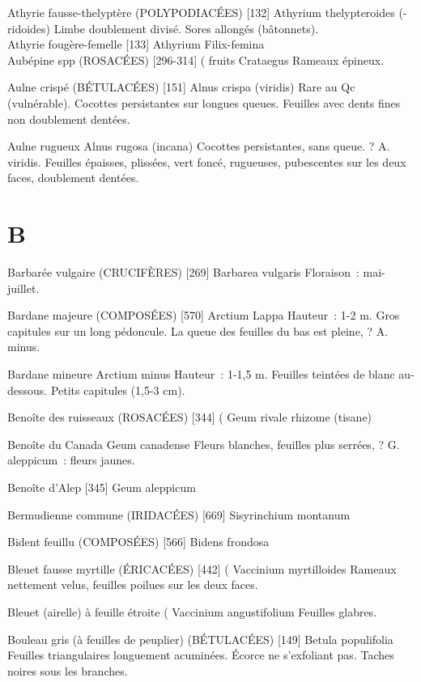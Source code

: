 \documentclass[book,12pt,a4paper,onecolumn,openany]{memoir}
\begin{document}
Athyrie fausse-thelyptère (POLYPODIACÉES)  [132]
				Athyrium thelypteroides (-ridoides)
Limbe doublement divisé. Sores allongés (bâtonnets).\\

Athyrie fougère-femelle  [133]
				Athyrium Filix-femina\\

Aubépine spp (ROSACÉES)  [296-314]				( fruits
				Crataegus
Rameaux épineux.

Aulne crispé (BÉTULACÉES)  [151]
				Alnus crispa (viridis)
Rare au Qc (vulnérable). Cocottes persistantes sur longues queues.
Feuilles avec dents fines non doublement dentées.

Aulne rugueux
				Alnus rugosa (incana)
Cocottes persistantes, sans queue. ? A. viridis.
Feuilles épaisses, plissées, vert foncé, rugueuses, pubescentes sur les deux faces, doublement dentées.
\chapter*{B}

Barbarée vulgaire (CRUCIFÈRES)  [269]
				Barbarea vulgaris
Floraison : mai-juillet.

Bardane majeure (COMPOSÉES)  [570]
				Arctium Lappa
Hauteur : 1-2 m. Gros capitules sur un long pédoncule. La queue des feuilles du bas est pleine, ? A. minus.

Bardane mineure
				Arctium minus
Hauteur : 1-1,5 m. Feuilles teintées de blanc au-dessous. Petits capitules (1,5-3 cm).

Benoîte des ruisseaux (ROSACÉES)  [344]			(
				Geum rivale			rhizome (tisane)

Benoîte du Canada
				Geum canadense
Fleurs blanches, feuilles plus serrées, ? G. aleppicum : fleurs jaunes.


Benoîte d’Alep  [345]
				Geum aleppicum

Bermudienne commune (IRIDACÉES)  [669]
				Sisyrinchium montanum

Bident feuillu (COMPOSÉES)  [566]
				Bidens frondosa

Bleuet fausse myrtille (ÉRICACÉES)  [442]			(
				Vaccinium myrtilloides
Rameaux nettement velus, feuilles poilues sur les deux faces.

Bleuet (airelle) à feuille étroite					(
				Vaccinium angustifolium
Feuilles glabres.

Bouleau gris (à feuilles de peuplier) (BÉTULACÉES) [149]
				Betula populifolia
Feuilles triangulaires longuement acuminées.
Écorce ne s’exfoliant pas.
Taches noires sous les branches.
\end{document}
